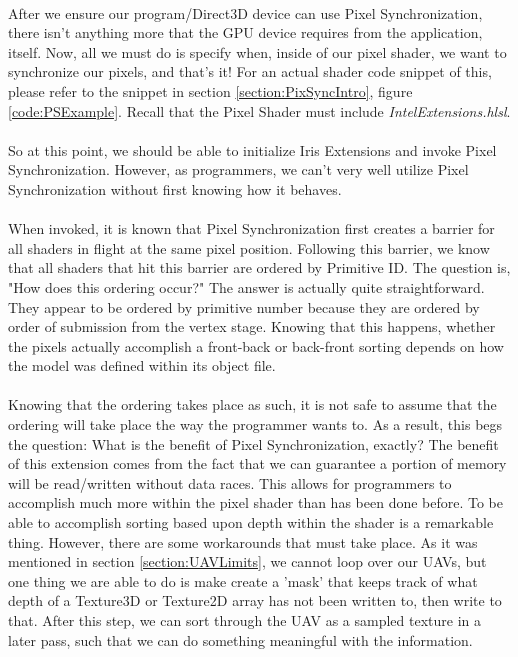 \documentclass[a4paper, 12pt]{article}
\begin{document}
\noindent \\ After we ensure our program/Direct3D device  can use Pixel
Synchronization, there isn't anything more that the GPU device requires from
the application, itself. Now, all we must do is specify when, inside of our
pixel shader, we want to synchronize our pixels, and that's it! For an actual
shader code snippet of this, please refer to the snippet in section
\ref{section:PixSyncIntro}, figure \ref{code:PSExample}. Recall that the Pixel
Shader must include \textit{IntelExtensions.hlsl}. \\ \\ So at this point, we
should be able to initialize Iris Extensions and invoke Pixel Synchronization.
However, as programmers, we can't very well utilize Pixel Synchronization
without first knowing how it behaves. \\ \\ When invoked, it is known that
Pixel Synchronization first creates a barrier for all shaders in flight at the
same pixel position. Following this barrier, we know that all shaders that hit
this barrier are ordered by Primitive ID. The question is, "How does this
ordering occur?" The answer is actually quite straightforward. They appear to
be ordered by primitive number because they are ordered by order of submission
from the vertex stage. Knowing that this happens, whether the pixels actually
accomplish a front-back or back-front sorting depends on how the model was
defined within its object file. \\ \\ Knowing that the ordering takes place as
such, it is not safe to assume that the ordering will take place the way the
programmer wants to. As a result, this begs the question: What is the benefit
of Pixel Synchronization, exactly? The benefit of this extension comes from
the fact that we can guarantee a portion of memory will be read/written
without data races. This allows for programmers to accomplish much more within
the pixel shader than has been done before. To be able to accomplish sorting
based upon depth within the shader is a remarkable thing. However, there are
some workarounds that must take place. As it was mentioned in section
\ref{section:UAVLimits}, we cannot loop over our UAVs, but one thing we are
able to do is make create a 'mask' that keeps track of what depth of a
Texture3D or Texture2D array has not been written to, then write to that.
After this step, we can sort through the UAV as a sampled texture in a later
pass, such that we can do something meaningful with the information.
\end{document}
